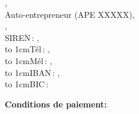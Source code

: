 \documentclass[a4paper]{article}
\def\footnotestyle#1{%
  {\textsf{\color{footnotegray}\fontsize{3mm}{0mm}\selectfont #1}}%
}
\begin{document}
\vfill

\small

\setlength{\columnsep}{1.5cm}
\begin{multicols}{2}
\noindent\companyname{},\\
Auto-entrepreneur {\small (APE XXXXX)},\\
\companyaddress{},\\
SIREN\,: \companysiren{},\\
\hbox to 1cm{Tél\,:\hss} \companytel,\\
\hbox to 1cm{Mél\,:\hss} \companyemail,\\
\hbox to 1cm{IBAN\,:\hss} \bankiban,\\
\hbox to 1cm{BIC\,:\hss} \bankbic
\end{multicols}

\footnotestyle{\textbf{Conditions de paiement:} \conditions }
\end{document}

